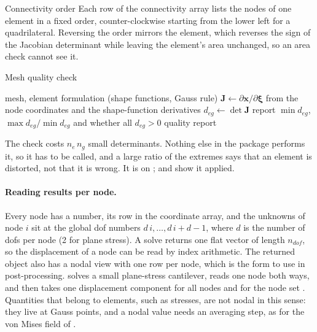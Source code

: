 \begin{sidenote}{Connectivity order}
Each row of the connectivity array lists the nodes of one element in a fixed order, counter-clockwise starting from the lower left for a quadrilateral. Reversing the order mirrors the element, which reverses the sign of the Jacobian determinant while leaving the element's area unchanged, so an area check cannot see it.
\end{sidenote}

\begin{algbox}{Mesh quality check}
\begin{pseudo}
\Require mesh, element formulation (shape functions, Gauss rule)
  \State $\bm J\gets\partial\bm x/\partial\bm\xi$ from the node coordinates and the shape-function derivatives
  \State $d_{eg}\gets\det\bm J$
\EndFor
\State report $\min d_{eg}$, $\max d_{eg}/\min d_{eg}$ and whether all $d_{eg}>0$
\Ensure quality report
\end{pseudo}
\end{algbox}

The check costs $n_e\,n_g$ small determinants. Nothing else in the package performs it, so it has to be called, and a large ratio of the extremes says that an element is distorted, not that it is wrong. It is  on ;  and  show it applied.

\paragraph{Reading results per node.} Every node has a number, its row in the coordinate array, and the unknowns of node $i$ sit at the global dof numbers $d\,i,\dots,d\,i+d-1$, where $d$ is the number of dofs per node (2 for plane stress). A solve returns one flat vector of length $n_{dof}$, so the displacement of a node can be read by index arithmetic. The returned object also has a nodal view with one row per node, which is the form to use in post-processing.  solves a small plane-stress cantilever, reads one node both ways, and then takes one displacement component for all nodes and for the node set . Quantities that belong to elements, such as stresses, are not nodal in this sense: they live at Gauss points, and a nodal value needs an averaging step, as for the von Mises field of .

